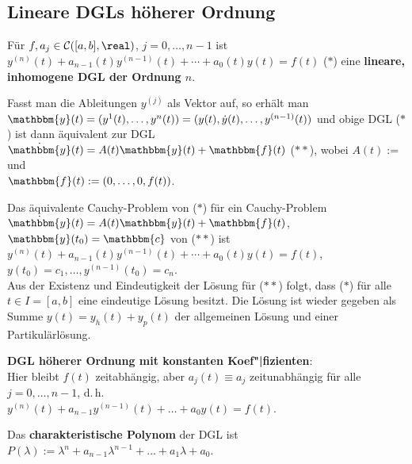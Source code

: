 \subsection{%
    Lineare DGLs höherer Ordnung%
}

Für $f, a_j \in \C([a, b], \real)$, $j = 0, \dotsc, n - 1$ ist
$y^{(n)}(t) + a_{n-1}(t) y^{(n-1)}(t) + \dotsb + a_0(t) y(t) = f(t)$ ($\ast$)
eine \textbf{lineare, inhomogene DGL der Ordnung $n$}.

Fasst man die Ableitungen $y^{(j)}$ als Vektor auf, so erhält man \\
$\mathbbm{y}(t) = (y^1(t), \dotsc, y^n(t)) =
(y(t), \dot{y}(t), \dotsc, y^{(n-1)}(t))$
und obige DGL ($\ast$) ist dann äquivalent zur DGL
$\dot{\mathbbm{y}}(t) = A(t) \mathbbm{y}(t) + \mathbbm{f}(t)$ ($\ast\ast$),
wobei $A(t) := $  und \\
$\mathbbm{f}(t) := (0, \dotsc, 0, f(t))$.

Das äquivalente Cauchy-Problem von ($\ast$) für ein Cauchy-Problem \\
$\dot{\mathbbm{y}}(t) = A(t) \mathbbm{y}(t) + \mathbbm{f}(t)$,
$\mathbbm{y}(t_0) = \mathbbm{c}$ von ($\ast\ast$) ist \\
$y^{(n)}(t) + a_{n-1}(t) y^{(n-1)}(t) + \dotsb + a_0(t) y(t) = f(t)$,
$y(t_0) = c_1, \dotsc, y^{(n-1)}(t_0) = c_n$. \\
Aus der Existenz und Eindeutigkeit der Lösung für ($\ast\ast$) folgt,
dass ($\ast$) für alle $t \in I = [a, b]$ eine eindeutige Lösung besitzt.
Die Lösung ist wieder gegeben als Summe
$y(t) = y_h(t) + y_p(t)$
der allgemeinen Lösung und einer Partikulärlösung.

\linie

\textbf{DGL höherer Ordnung mit konstanten Koef"|fizienten}: \\
Hier bleibt $f(t)$ zeitabhängig, aber $a_j(t) \equiv a_j$ zeitunabhängig
für alle $j = 0, \dotsc, n - 1$, d.\,h. \\
$y^{(n)}(t) + a_{n-1} y^{(n-1)}(t) + \dotsc + a_0 y(t) = f(t)$.

Das \textbf{charakteristische Polynom} der DGL ist
$P(\lambda) := \lambda^n + a_{n-1} \lambda^{n-1} + \dotsc + a_1 \lambda + a_0$.


